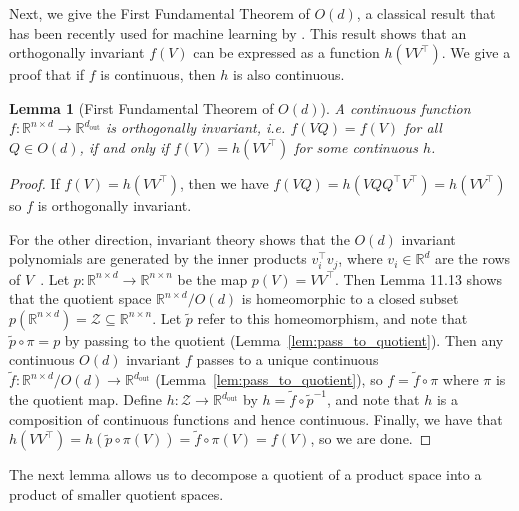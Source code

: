 \documentclass{article} \usepackage{iclr2023_conference,times}
\newcommand{\RR}{\mathbb R}
\newcommand{\mc}[1]{\mathcal{#1}}
\newcommand{\mrm}[1]{\mathrm{#1}}
\newcommand{\dout}{d_{\mrm{out}}}
\newtheorem{lemma}{Lemma}
\begin{document}
Next, we give the First Fundamental Theorem of $O(d)$, a classical result that has been recently used for machine learning by \cite{villar2021scalars}. This result shows that an orthogonally invariant $f(V)$ can be expressed as a function $h(VV^\top)$. We give a proof that if $f$ is continuous, then $h$ is also continuous.
\begin{lemma}[First Fundamental Theorem of $O(d)$]\label{lem:first_fund}
    A continuous function $f: \RR^{n \times d} \to \RR^{\dout}$ is orthogonally invariant, i.e. $f(VQ) = f(V)$ for all $Q \in O(d)$, if and only if $f(V) = h(VV^\top)$ for some continuous $h$.
\end{lemma}
\begin{proof}
    If $f(V) = h(VV^\top)$, then we have $f(VQ) = h(VQQ^\top V^\top) = h(VV^\top)$ so $f$ is orthogonally invariant.

    For the other direction, invariant theory shows that the $O(d)$ invariant polynomials are generated by the inner products $v_i^\top v_j$, where $v_i \in \RR^d$ are the rows of $V$~\citep{kraft1996classical}. Let $p: \RR^{n \times d} \to \RR^{n \times n}$ be the map $p(V) = VV^\top$. Then \cite{gonzalez2003c} Lemma 11.13 shows that the quotient space $\RR^{n \times d} / O(d)$ is homeomorphic to a closed subset $p(\RR^{n \times d}) = \mc Z \subseteq \RR^{n \times n}$. Let $\tilde p$ refer to this homeomorphism, and note that $\tilde p \circ \pi = p$ by passing to the quotient (Lemma~\ref{lem:pass_to_quotient}). Then any continuous $O(d)$ invariant $f$ passes to a unique continuous $\tilde f: \RR^{n \times d} / O(d) \to \RR^{\dout}$ (Lemma~\ref{lem:pass_to_quotient}), so $f = \tilde f \circ \pi$ where $\pi$ is the quotient map. Define $h : \mc Z \to \RR^{\dout}$ by $h = \tilde f \circ \tilde p^{-1}$, and note that $h$ is a composition of continuous functions and hence continuous. Finally, we have that $h(VV^\top) = h(\tilde p \circ \pi(V)) = \tilde f \circ \pi(V) = f(V)$, so we are done.
\end{proof}

The next lemma allows us to decompose a quotient of a product space into a product of smaller quotient spaces.
\end{document}
